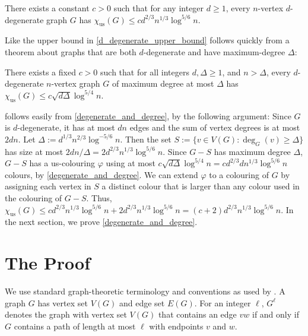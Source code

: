 \documentclass{patmorin}
\newcommand{\trn}{\chi_{\mathrm{us}}}
\begin{document}
\begin{thm}\label{d_degenerate_upper_bound}
  There exists a constant $c>0$ such that for any integer $d\ge 1$, every $n$-vertex $d$-degenerate graph $G$ has $\trn(G) \le c d^{2/3} n^{1/3}\log^{5/6}  n$.
\end{thm}

Like the upper bound in \cite{karpas.neiman.ea:on} \cref{d_degenerate_upper_bound} follows quickly from a theorem about graphs that are both $d$-degenerate and have maximum-degree $\Delta$:

\begin{thm}\label{degenerate_and_degree}
  There exists a fixed $c>0$ such that
  for all integers $d,\Delta \ge 1$, and $n> \Delta$, every $d$-degenerate $n$-vertex graph $G$ of maximum degree at most $\Delta$ has
  $\trn(G)\leq c \sqrt{d\Delta}\log^{5/4} n$.
\end{thm}

 follows easily from \cref{degenerate_and_degree}, by the following argument:  Since $G$ is $d$-degenerate, it has at most $dn$ edges and the sum of vertex degrees is at most $2dn$.  Let $\Delta:=d^{1/3}n^{2/3}\log^{-5/6} n$.  Then the set $S:=\{v\in V(G):\deg_G(v)\ge \Delta\}$ has size at most $2dn/\Delta=2d^{2/3}n^{1/3}\log^{5/6} n$.  Since $G-S$ has maximum degree $\Delta$, $G-S$ has a us-colouring $\varphi$ using at most $c\sqrt{d\Delta}\log^{5/4} n = cd^{2/3}dn^{1/3}\log^{5/6}  n$ colours, by \cref{degenerate_and_degree}. We can extend $\varphi$ to a colouring of $G$ by assigning each vertex in $S$ a distinct colour that is larger than any colour used in the colouring of $G-S$.  Thus, $\trn(G)\le cd^{2/3}n^{1/3}\log^{5/6} n+2d^{2/3}n^{1/3}\log^{5/6} n= (c+2)d^{2/3}n^{1/3}\log^{5/6} n$.  In the next section, we prove \cref{degenerate_and_degree}.


\section{The Proof}

We use standard graph-theoretic terminology and conventions as used by \citet{diestel:graph}. A graph $G$ has vertex set $V(G)$ and edge set $E(G)$.  For an integer $\ell$, $G^\ell$ denotes the graph with vertex set $V(G)$ that contains an edge $vw$ if and only if $G$ contains a path of length at most $\ell$ with endpoints $v$ and $w$.
\end{document}

